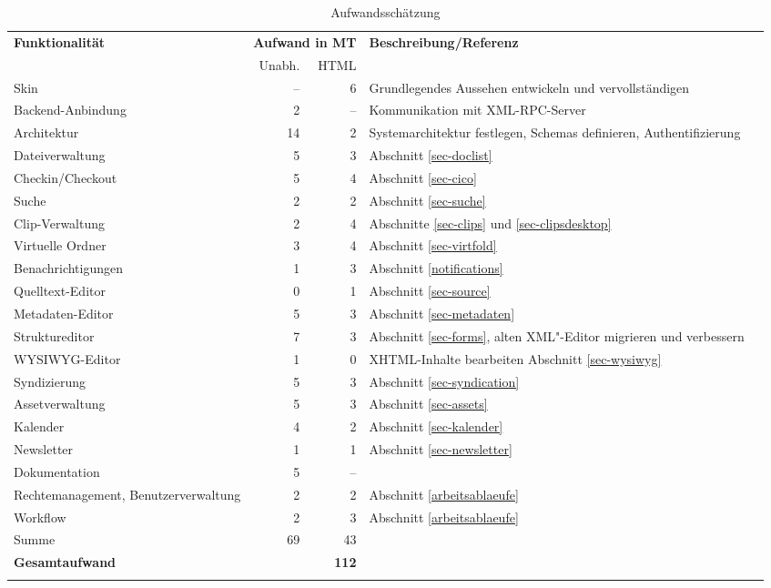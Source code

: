 \begin{longtable}{>{\raggedright}p{4cm}<{}rr>{\raggedright}p{5cm}<{}l}
  \toprule
  \bf Funktionalität     & \multicolumn{2}{c}{\bf Aufwand in MT} & 
        \bf Beschreibung/Referenz&\\
                         & Unabh. & HTML & &  \\
  \midrule\endhead
Skin                     &  --  & 6 &
      Grundlegendes Aussehen entwickeln und vervollständigen &\\
Backend-Anbindung        &  2   & -- & 
      Kommunikation mit XML-RPC-Server & \\
Architektur              & 14   &  2 &
      Systemarchitektur festlegen, 
      Schemas definieren, Authentifizierung &\\
Dateiverwaltung          &  5   & 3  &
      Abschnitt \ref{sec-doclist} &\\ 
Checkin/Checkout         &  5   & 4 &
      Abschnitt \ref{sec-cico} &\\
Suche                    &  2   & 2 & 
      Abschnitt \ref{sec-suche} &\\
Clip-Verwaltung          &  2   & 4 & 
      Abschnitte \ref{sec-clips} und \ref{sec-clipsdesktop} &\\
Virtuelle Ordner         &  3   & 4   &
      Abschnitt \ref{sec-virtfold} &\\
Benachrichtigungen       &  1   & 3 &
      Abschnitt \ref{notifications}&\\
Quelltext-Editor         &  0   & 1  &
        Abschnitt \ref{sec-source} &\\
Metadaten-Editor         &  5   &  3 &
      Abschnitt \ref{sec-metadaten} &\\
Struktureditor           &  7   &  3 &
      Abschnitt \ref{sec-forms}, alten XML"-Editor migrieren und verbessern&\\
WYSIWYG-Editor         &  1     &  0  & XHTML-Inhalte bearbeiten
      Abschnitt \ref{sec-wysiwyg} &\\
Syndizierung             &  5   & 3  & 
      Abschnitt \ref{sec-syndication} &\\
Assetverwaltung          &  5   &  3   &
      Abschnitt \ref{sec-assets} &\\
Kalender                 &4     & 2   &
      Abschnitt \ref{sec-kalender} &\\
Newsletter               & 1    & 1   &
      Abschnitt \ref{sec-newsletter} &\\
Dokumentation            &  5   & -- \\
Rechtemanagement, Benutzerverwaltung
                         &  2   & 2 &
     Abschnitt \ref{arbeitsablaeufe}& \\
Workflow                 &  2   & 3 &
     Abschnitt \ref{arbeitsablaeufe}& \\
\midrule
Summe                    &  69  & 43 \\
\bf Gesamtaufwand        &      & \bf 112\\
\bottomrule
\caption{Aufwandsschätzung \label{tab-aufwand}}
\end{longtable}


